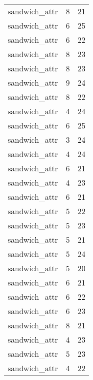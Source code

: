 \begin{table}
\begin{tabular}{lrr}
                   sandwich\_attr &         8 &        21 \\
                   sandwich\_attr &         6 &        25 \\
                   sandwich\_attr &         6 &        22 \\
                   sandwich\_attr &         8 &        23 \\
                   sandwich\_attr &         8 &        23 \\
                   sandwich\_attr &         9 &        24 \\
                   sandwich\_attr &         8 &        22 \\
                   sandwich\_attr &         4 &        24 \\
                   sandwich\_attr &         6 &        25 \\
                   sandwich\_attr &         3 &        24 \\
                   sandwich\_attr &         4 &        24 \\
                   sandwich\_attr &         6 &        21 \\
                   sandwich\_attr &         4 &        23 \\
                   sandwich\_attr &         6 &        21 \\
                   sandwich\_attr &         5 &        22 \\
                   sandwich\_attr &         5 &        23 \\
                   sandwich\_attr &         5 &        21 \\
                   sandwich\_attr &         5 &        24 \\
                   sandwich\_attr &         5 &        20 \\
                   sandwich\_attr &         6 &        21 \\
                   sandwich\_attr &         6 &        22 \\
                   sandwich\_attr &         6 &        23 \\
                   sandwich\_attr &         8 &        21 \\
                   sandwich\_attr &         4 &        23 \\
                   sandwich\_attr &         5 &        23 \\
                   sandwich\_attr &         4 &        22 \\

\end{tabular}
\end{table}
